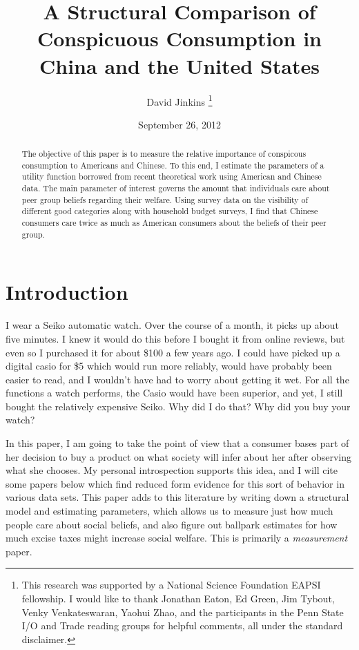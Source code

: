 \documentclass[12pt]{article}
\title{A Structural Comparison of Conspicuous Consumption in China and the United States
}
\author{David Jinkins
    \thanks{This research was supported by a National Science Foundation EAPSI fellowship.  I would like to thank Jonathan Eaton, Ed Green, Jim Tybout, Venky Venkateswaran, Yaohui Zhao, and the participants in the Penn State I/O and Trade reading groups for helpful comments, all under the standard disclaimer.}
}
\date{September 26, 2012}
\begin{document}
\maketitle

\begin{abstract}
    The objective of this paper is to measure the relative importance of conspicous consumption to Americans and Chinese.  To this end, I estimate the parameters of a utility function borrowed from recent theoretical work using American and Chinese data.  The main parameter of interest governs the amount that individuals care about peer group beliefs regarding their welfare.  Using survey data on the visibility of different good categories along with household budget surveys, I find that Chinese consumers care twice as much as American consumers about the beliefs of their peer group.
\end{abstract}

\section{Introduction}

I wear a Seiko automatic watch.  Over the course of a month, it picks up about five minutes.  I knew it would do this before I bought it from online reviews, but even so I purchased it for about \$100 a few years ago.  I could have picked up a digital casio for \$5 which would run more reliably, would have probably been easier to read, and I wouldn't have had to worry about getting it wet.  For all the functions a watch performs, the Casio would have been superior, and yet, I still bought the relatively expensive Seiko.  Why did I do that?  Why did you buy your watch?

In this paper, I am going to take the point of view that a consumer bases part of her decision to buy a product on what society will infer about her after observing what she chooses.  
My personal introspection supports this idea, and I will cite some papers below which find reduced form evidence for this sort of behavior in various data sets. This paper adds to this literature by writing down a structural model and estimating parameters, which allows us to measure just how much people care about social beliefs, and also figure out ballpark estimates for how much excise taxes might increase social welfare. This is primarily a \emph{measurement} paper.
\end{document}
